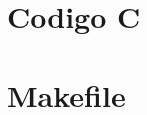 \documentclass[10pt,spanish,a4paper,openany,notitlepage]{article}
\newcommand{\captionlisting}[2][]{%
}
\begin{document}
\begin{enumerate}


\end{enumerate}




\newpage
\appendix
\section{Codigo C}

\captionlisting{tp.c}

\newpage
\section{Makefile}



\newpage
\begin{thebibliography}{99} %


\end{thebibliography}
\end{document}
